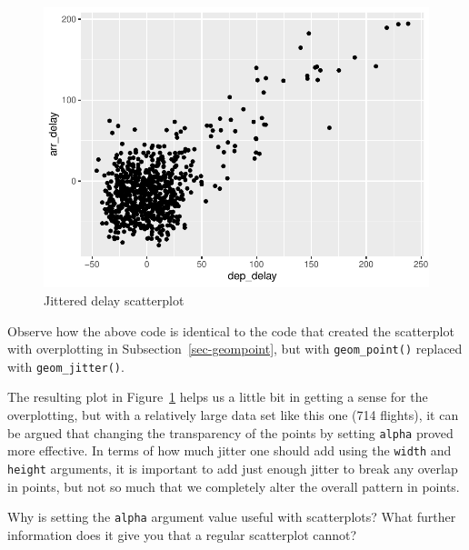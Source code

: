 \documentclass[
  letterpaper,
  DIV=11,
  numbers=noendperiod]{scrreprt}
\theoremstyle{definition}
\theoremstyle{remark}
\begin{document}
\begin{figure}[H]

{\centering \includegraphics{02-visualization_files/figure-pdf/fig-jitter-1.pdf}

}

\caption{\label{fig-jitter}Jittered delay scatterplot}

\end{figure}

Observe how the above code is identical to the code that created the
scatterplot with overplotting in Subsection~\ref{sec-geompoint}, but
with \texttt{geom\_point()} replaced with \texttt{geom\_jitter()}.

The resulting plot in Figure~\ref{fig-jitter} helps us a little bit in
getting a sense for the overplotting, but with a relatively large data
set like this one (714 flights), it can be argued that changing the
transparency of the points by setting \texttt{alpha} proved more
effective. In terms of how much jitter one should add using the
\texttt{width} and \texttt{height} arguments, it is important to add
just enough jitter to break any overlap in points, but not so much that
we completely alter the overall pattern in points.

\begin{tcolorbox}[enhanced jigsaw, coltitle=black, toprule=.15mm, bottomtitle=1mm, breakable, leftrule=.75mm, title={{🎯} Learning Check 2.7}, opacitybacktitle=0.6, colback=white, rightrule=.15mm, opacityback=0, toptitle=1mm, colbacktitle=quarto-callout-tip-color!10!white, colframe=quarto-callout-tip-color-frame, titlerule=0mm, arc=.35mm, bottomrule=.15mm, left=2mm]
Why is setting the \texttt{alpha} argument value useful with
scatterplots? What further information does it give you that a regular
scatterplot cannot?
\end{tcolorbox}
\end{document}
